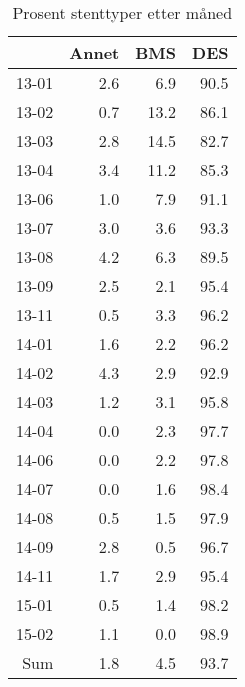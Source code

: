 \documentclass[presentation,xcolor=pdftex,dvipsnames,table]{beamer}
\begin{document}
\begin{frame}
\begin{tiny}
\begin{table}[ht]
\centering
\begin{tabular}{rrrr}
  \toprule
 & Annet & BMS & DES \\ 
  \midrule
13-01 & 2.6 & 6.9 & 90.5 \\ 
  13-02 & 0.7 & 13.2 & 86.1 \\ 
  13-03 & 2.8 & 14.5 & 82.7 \\ 
  13-04 & 3.4 & 11.2 & 85.3 \\ 
  13-06 & 1.0 & 7.9 & 91.1 \\ 
  13-07 & 3.0 & 3.6 & 93.3 \\ 
  13-08 & 4.2 & 6.3 & 89.5 \\ 
  13-09 & 2.5 & 2.1 & 95.4 \\ 
  13-11 & 0.5 & 3.3 & 96.2 \\ 
  14-01 & 1.6 & 2.2 & 96.2 \\ 
  14-02 & 4.3 & 2.9 & 92.9 \\ 
  14-03 & 1.2 & 3.1 & 95.8 \\ 
  14-04 & 0.0 & 2.3 & 97.7 \\ 
  14-06 & 0.0 & 2.2 & 97.8 \\ 
  14-07 & 0.0 & 1.6 & 98.4 \\ 
  14-08 & 0.5 & 1.5 & 97.9 \\ 
  14-09 & 2.8 & 0.5 & 96.7 \\ 
  14-11 & 1.7 & 2.9 & 95.4 \\ 
  15-01 & 0.5 & 1.4 & 98.2 \\ 
  15-02 & 1.1 & 0.0 & 98.9 \\ 
  Sum & 1.8 & 4.5 & 93.7 \\ 
   \bottomrule
\end{tabular}
\caption{Prosent stenttyper etter måned} 
\end{table}\end{tiny}
\end{frame}
\end{document}
